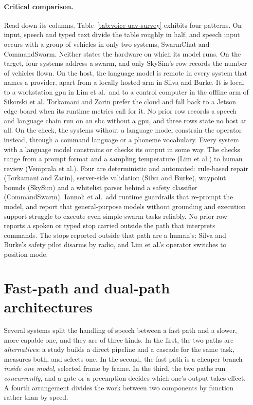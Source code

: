 \paragraph{Critical comparison.} Read down its columns, Table~\ref{tab:voice-uav-survey} exhibits
four patterns. On input, speech and typed text divide the table roughly in half, and speech input
occurs with a group of vehicles in only two systems, SwarmChat and CommandSwarm. Neither states the
hardware on which its model runs. On the target, four systems address a swarm, and only SkySim's row
records the number of vehicles flown. On the host, the
language model is remote in every system that names a provider, apart from a locally hosted arm in
Silva and Burke. It is local to a workstation \gls{gpu} in Lim et al.\ and to a control computer in
the offline arm of Sikorski et al. Torkamani and Zarin prefer the cloud and fall back to a Jetson
edge board when its runtime metrics call for it. No prior row records a speech and language chain
run on an \gls{sbc} without a \gls{gpu}, and three rows state no host at all. On the check, the
systems without a language model constrain the operator instead, through a command language or a
phoneme vocabulary. Every system with a language model constrains or checks its output in some way.
The checks range from a prompt format and a sampling temperature (Lim et al.) to human review
(Vemprala et al.). Four are deterministic and automated: rule-based repair (Torkamani and Zarin),
server-side validation (Silva and Burke), waypoint bounds (SkySim) and a whitelist parser behind a
safety classifier (CommandSwarm). Iannoli et al.\ add runtime guardrails that re-prompt the model,
and report that general-purpose models without grounding and execution support struggle to execute
even simple swarm tasks reliably. No prior row reports a spoken or typed stop carried
outside the path that interprets commands. The stops reported outside that path are a human's:
Silva and Burke's safety pilot disarms by radio, and Lim et al.'s operator switches to position
mode.

\section{Fast-path and dual-path architectures}
\label{sec:soa-dual-path}
Several systems split the handling of speech between a fast path and a slower, more capable one, and
they are of three kinds. In the first, the two paths are \emph{alternatives}: a study builds a
direct pipeline and a cascade for the same task, measures both, and selects one. In the second, the
fast path is a cheaper branch \emph{inside one model}, selected frame by frame. In the third, the
two paths run \emph{concurrently}, and a gate or a preemption decides which one's output takes
effect. A fourth arrangement divides the work between two components by function rather than by
speed.

